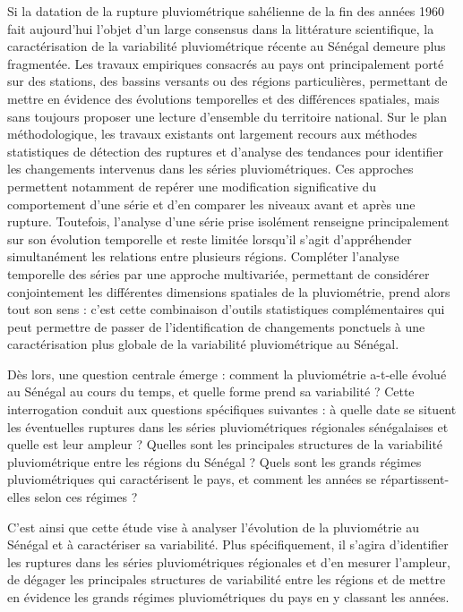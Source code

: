 \documentclass[12pt,a4paper]{report}
\begin{document}
Si la datation de la rupture pluviométrique sahélienne de la fin des années 1960 fait aujourd'hui l'objet d'un large consensus dans la littérature scientifique, la caractérisation de la variabilité pluviométrique récente au Sénégal demeure plus fragmentée. Les travaux empiriques consacrés au pays ont principalement porté sur des stations, des bassins versants ou des régions particulières, permettant de mettre en évidence des évolutions temporelles et des différences spatiales, mais sans toujours proposer une lecture d'ensemble du territoire national. Sur le plan méthodologique, les travaux existants ont largement recours aux méthodes statistiques de détection des ruptures et d'analyse des tendances pour identifier les changements intervenus dans les séries pluviométriques. Ces approches permettent notamment de repérer une modification significative du comportement d'une série et d'en comparer les niveaux avant et après une rupture. Toutefois, l'analyse d'une série prise isolément renseigne principalement sur son évolution temporelle et reste limitée lorsqu'il s'agit d'appréhender simultanément les relations entre plusieurs régions. Compléter l'analyse temporelle des séries par une approche multivariée, permettant de considérer conjointement les différentes dimensions spatiales de la pluviométrie, prend alors tout son sens : c'est cette combinaison d'outils statistiques complémentaires qui peut permettre de passer de l'identification de changements ponctuels à une caractérisation plus globale de la variabilité pluviométrique au Sénégal.

Dès lors, une question centrale émerge : comment la pluviométrie a-t-elle évolué au Sénégal au cours du temps, et quelle forme prend sa variabilité ? Cette interrogation conduit aux questions spécifiques suivantes : à quelle date se situent les éventuelles ruptures dans les séries pluviométriques régionales sénégalaises et quelle est leur ampleur ? Quelles sont les principales structures de la variabilité pluviométrique entre les régions du Sénégal ? Quels sont les grands régimes pluviométriques qui caractérisent le pays, et comment les années se répartissent-elles selon ces régimes ?

C’est ainsi que cette étude vise à analyser l’évolution de la pluviométrie au Sénégal et à caractériser sa variabilité. Plus spécifiquement, il s’agira d’identifier les ruptures dans les séries pluviométriques régionales et d’en mesurer l’ampleur, de dégager les principales structures de variabilité entre les régions et de mettre en évidence les grands régimes pluviométriques du pays en y classant les années.
\end{document}
